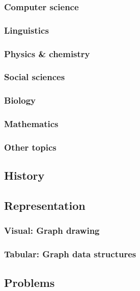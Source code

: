 \documentclass[oneside]{book}
\numberwithin{equation}{section}
\begin{document}
\subsubsection{Computer science}

\subsubsection{Linguistics}

\subsubsection{Physics \& chemistry}

\subsubsection{Social sciences}

\subsubsection{Biology}

\subsubsection{Mathematics}

\subsubsection{Other topics}

\subsection{History}

\subsection{Representation}

\subsubsection{Visual: Graph drawing}

\subsubsection{Tabular: Graph data structures}

\subsection{Problems}
\end{document}
